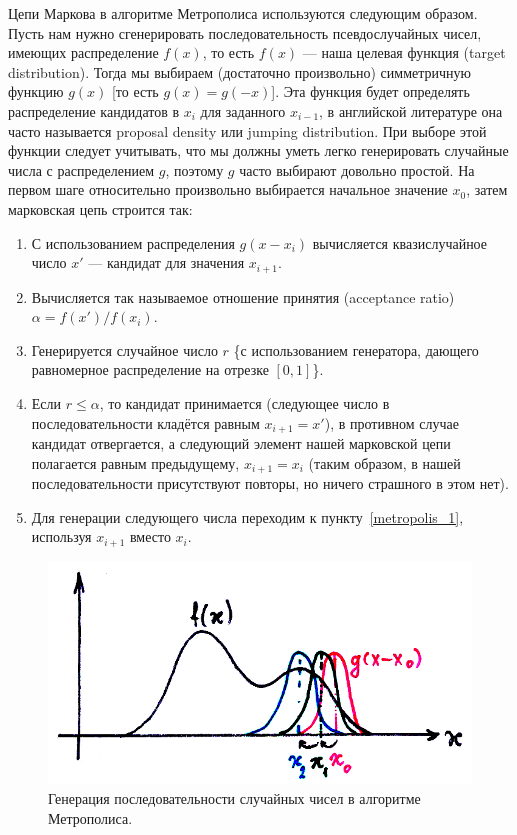 \documentclass{book}
\begin{document}
Цепи Маркова в алгоритме Метрополиса используются следующим образом. Пусть нам нужно сгенерировать
последовательность псевдослучайных чисел, имеющих распределение $f(x)$, то есть $f(x)$ --- наша
целевая функция (target distribution). Тогда мы выбираем (достаточно произвольно) симметричную
функцию $g(x)$ [то есть $g(x) = g(-x)$]. Эта функция будет определять распределение кандидатов в
$x_i$ для заданного $x_{i - 1}$, в английской литературе она часто называется proposal density или
jumping distribution. При выборе этой функции следует учитывать, что мы должны уметь легко
генерировать случайные числа с распределением $g$, поэтому $g$ часто выбирают довольно простой. На
первом шаге относительно произвольно выбирается начальное значение $x_0$, затем марковская цепь
строится так:
\begin{enumerate}
    \item \label{metropolis_1} С использованием распределения $g(x-x_i)$ вычисляется квазислучайное
        число $x'$ --- кандидат для значения $x_{i + 1}$.
    \item Вычисляется так называемое отношение принятия (acceptance ratio) $\alpha = f(x') / f(x_i)$.
    \item Генерируется случайное число $r$ \{с использованием генератора, дающего равномерное
        распределение на отрезке $[0, 1]$\}.
    \item \label{metropolis_acceptance} Если $r \leq \alpha$, то кандидат принимается (следующее
        число в последовательности кладётся равным $x_{i + 1} = x'$), в противном случае кандидат
        отвергается, а следующий элемент нашей марковской цепи полагается равным предыдущему, $x_{i
        + 1} = x_i$ (таким образом, в нашей последовательности присутствуют повторы, но ничего
        страшного в этом нет).
    \item Для генерации следующего числа переходим к пункту~\ref{metropolis_1}, используя $x_{i +
        1}$ вместо $x_i$.
\end{enumerate}

\begin{figure}
	\includegraphics[width=0.8\linewidth]{metropolis.png}
    \caption{\label{dots-for-monte-carlo}Генерация последовательности случайных чисел в алгоритме
    Метрополиса.}
\end{figure}
\end{document}
